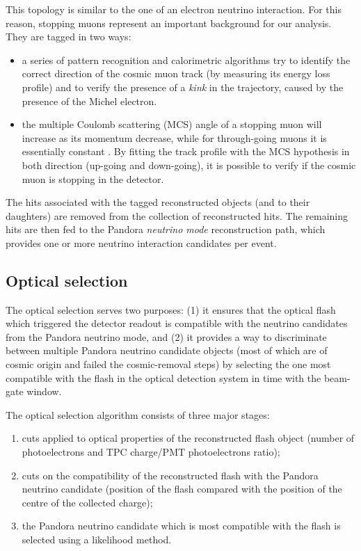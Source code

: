\begin{description}
This topology is similar to the one of an electron neutrino interaction. For this reason, stopping muons represent an important background for our analysis. 
They are tagged in two ways:
\begin{itemize}
    \item a series of pattern recognition and calorimetric algorithms try to identify the correct direction of the cosmic muon track (by measuring its energy loss profile) and to verify the presence of a \emph{kink} in the trajectory, caused by the presence of the Michel electron.
    \item the multiple Coulomb scattering (MCS) angle of a stopping muon will increase as its momentum decrease, while for through-going muons it is essentially constant \cite{Abratenko:2017nki}. By fitting the track profile with the MCS hypothesis in both direction (up-going and down-going), it is possible to verify if the cosmic muon is stopping in the detector. 
\end{itemize}

\end{description}

The hits associated with the tagged reconstructed objects (and to their daughters) are removed from the collection of reconstructed hits. The remaining hits are then fed to the Pandora \emph{neutrino mode} reconstruction path, which provides one or more neutrino interaction candidates per event. 

\subsection{Optical selection}\label{sec:optical_pre_cuts}
The optical selection serves two purposes: (1) it ensures that the optical flash which triggered the detector readout is compatible with the neutrino candidates from the Pandora neutrino mode, and (2) it provides a way to discriminate between multiple Pandora neutrino candidate objects (most of which are of cosmic origin and failed the cosmic-removal steps) by selecting the one most compatible with the flash in the optical detection system in time with the beam-gate window.

The optical selection algorithm consists of three major stages:
\begin{enumerate}
\item cuts applied to optical properties of the reconstructed flash object (number of photoelectrons and TPC charge/PMT photoelectrons ratio);
\item cuts on the compatibility of the reconstructed flash with the Pandora neutrino candidate (position of the flash compared with the position of the centre of the collected charge);
\item the Pandora neutrino candidate which is most compatible with the flash is selected using a likelihood method.
\end{enumerate}

